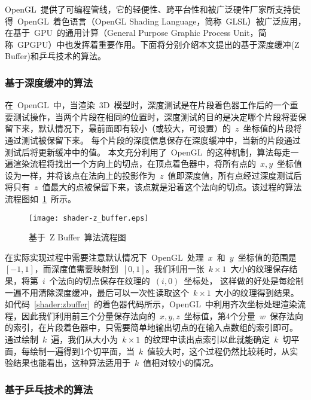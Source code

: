 OpenGL~提供了可编程管线，它的轻便性、跨平台性和被广泛硬件厂家所支持使得~OpenGL~着色语言（OpenGL Shading Language，简称~GLSL）被广泛应用，在基于~GPU~的通用计算（General
Purpose Graphic Process Unit，简称~GPGPU）中也发挥着重要作用。下面将分别介绍本文提出的基于深度缓冲(Z Buffer)和乒乓技术的算法。

\subsubsection{基于深度缓冲的算法}
	
在~OpenGL~中，当渲染~3D~模型时，深度测试是在片段着色器工作后的一个重要测试操作，当两个片段在相同的位置时，深度测试的目的是决定哪个片段将要保留下来，默认情况下，最前面即有较小（或较大，可设置）的~$z$~坐标值的片段将通过测试被保留下来。
每个片段的深度信息保存在深度缓冲中，当新的片段通过测试后将更新缓冲中的值。
本文充分利用了~OpenGL~的这种机制，算法每走一遍渲染流程将找出一个方向上的切点，在顶点着色器中，将所有点的~$x,y$~坐标值设为一样，并将该点在法向上的投影作为~$z$~值即深度值，所有点经过深度测试后将只有~$z$~值最大的点被保留下来，该点就是沿着这个法向的切点。该过程的算法流程图如~\ref{fig:flowchart:zbuffer}~所示。

\begin{figure}[htbp]
  \centering
  \texttt{[image: shader-z\_buffer.eps]}
  \caption{基于~Z Buffer~算法流程图}
  \label{fig:flowchart:zbuffer}
\end{figure}

在实际实现过程中需要注意默认情况下~OpenGL~处理~$x$~和~$y$~坐标值的范围是~$[-1,1]$，而深度值需要映射到~$[0,1]$。我们利用一张~$k \times 1$~大小的纹理保存结果，将第~$i$~个法向的切点保存在纹理的~$(i,0)$~坐标处，
这样做的好处是每绘制一遍不用清除深度缓冲，最后可以一次性读取这个~$k \times 1$~大小的纹理得到结果。
如代码~\ref{shader:zbuffer}~的着色器代码所示，OpenGL~中利用齐次坐标处理渲染流程，因此我们利用前三个分量保存法向的~$x,y,z$~坐标值，第4个分量~$w$~保存法向的索引，在片段着色器中，只需要简单地输出切点的在输入点数组的索引即可。
通过绘制~$k$~遍，我们从大小为~$k \times 1$~的纹理中读出点索引以此就能确定~$k$~切平面，每绘制一遍得到1个切平面，当~$k$~值较大时，这个过程仍然比较耗时，从实验结果也能看出，这种算法适用于~$k$~值相对较小的情况。
%


\subsubsection{基于乒乓技术的算法}

